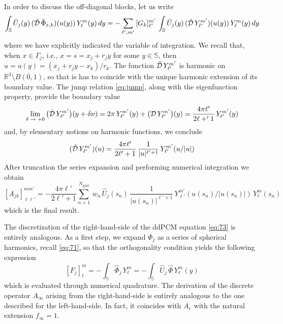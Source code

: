 In order to discuss the off-diagonal blocks, let us write
\[
 \int_{\mathbb{S}} \hat{U}_j(y) \, (\tilde{\mathcal{D}} \, \hat{\Phi}_{\varepsilon,k})(u(y)) \, Y_{\ell}^{m}(y) \, dy = - \sum_{\ell',m'} \, [G_k]_{\ell'}^{m'} \,  \int_{\mathbb{S}} \hat{U}_j(y) \, (\tilde{\mathcal{D}} \, Y_{\ell'}^{m'})(u(y)) \, Y_{\ell}^{m}(y) \, dy 
\]
where we have explicitly indicated the variable of integration. We recall that, when $x \in \Gamma_j$, i.e., $x = s = x_j + r_j y$ for some $y \in \mathbb{S}$, then $u = u(y) = (x_j + r_j y -x_k)/r_k$. The function $\tilde{\mathcal{D}} \, Y_{\ell'}^{m'}$ is harmonic on $\mathbb{R}^3 \setminus \overline{B(0,1)}$, so that is has to coincide with the unique harmonic extension of its boundary value. The jump relation \eqref{eq:jump}, along with the eigenfunction property, provide the boundary value
\[
\lim_{\delta \; \to \; + 0} \big(\tilde{\mathcal{D}} \, Y_{\ell'}^{m'}\big)(y + \delta \nu) =  2\pi \,Y_{\ell'}^{m'}(y)+ \big( \mathcal{D} \, Y_{\ell'}^{m'} \big)(y) = \frac{4 \pi \ell'}{2 \ell +' 1} \, Y_{\ell'}^{m'}(y)
\]
and, by elementary notions on harmonic functions, we conclude
\[
(\tilde{\mathcal{D}} \, Y_{\ell'}^{m'})(u) = \frac{4 \pi \ell'}{2 \ell' + 1} \, \frac{1}{|u|^{\ell' + 1}} \,  Y_{\ell'}^{m'}(u/|u|)
\]
After truncation the series expansion and performing numerical integration we obtain
\begin{equation}\label{eq:ajk}
[A_{jk}]_{\ell \ell'}^{m m'} =-  \frac{4 \pi \ell'}{2 \ell' + 1}  \sum_{n=1}^{N_\text{grid}} \, w_n  \,  \hat{U}_j(s_n) \, \frac{1}{|u(s_n)|^{\ell' + 1}} \, Y_{\ell'}^{m'}(u(s_n) / |u(s_n)|) \, Y_{\ell}^{m}(s_n)
\end{equation}
which is the final result.


The discretization of the right-hand-side of the ddPCM equation \eqref{eq:73} is entirely analogous. As a first step, we expand $\Phi_j$ as a series of spherical harmonics, recall \eqref{eq:71}, so that the orthogonality condition yields the following expression
\[
[F_j]_\ell^m = - \int_{\mathbb{S}} \hat{\Phi}_j \, Y_\ell^m= - \int_{\mathbb{S}} \hat{U}_j \, \hat{\Phi} \, Y_\ell^m(y)
\]
which is evaluated through numerical quadrature. The derivation of the discrete operator $A_\infty$ arising from the right-hand-side is entirely analogous to the one described for the left-hand-side. In fact, it coincides with $A_\varepsilon$ with the natural extension $f_\infty = 1$.